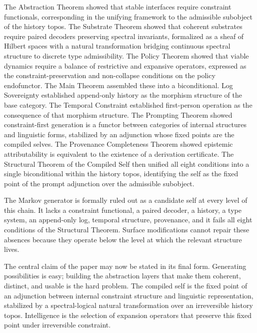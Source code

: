 \documentclass[12pt, a4paper]{article}
\theoremstyle{plain}
\theoremstyle{definition}
\theoremstyle{remark}
\begin{document}
The Abstraction Theorem showed that stable interfaces require constraint functionals, corresponding in the unifying framework to the admissible subobject of the history topos. The Substrate Theorem showed that coherent substrates require paired decoders preserving spectral invariants, formalized as a sheaf of Hilbert spaces with a natural transformation bridging continuous spectral structure to discrete type admissibility. The Policy Theorem showed that viable dynamics require a balance of restrictive and expansive operators, expressed as the constraint-preservation and non-collapse conditions on the policy endofunctor. The Main Theorem assembled these into a biconditional. Log Sovereignty established append-only history as the morphism structure of the base category. The Temporal Constraint established first-person operation as the consequence of that morphism structure. The Prompting Theorem showed constraint-first generation is a functor between categories of internal structures and linguistic forms, stabilized by an adjunction whose fixed points are the compiled selves. The Provenance Completeness Theorem showed epistemic attributability is equivalent to the existence of a derivation certificate. The Structural Theorem of the Compiled Self then unified all eight conditions into a single biconditional within the history topos, identifying the self as the fixed point of the prompt adjunction over the admissible subobject.

The Markov generator is formally ruled out as a candidate self at every level of this chain. It lacks a constraint functional, a paired decoder, a history, a type system, an append-only log, temporal structure, provenance, and it fails all eight conditions of the Structural Theorem. Surface modifications cannot repair these absences because they operate below the level at which the relevant structure lives.

The central claim of the paper may now be stated in its final form. Generating possibilities is easy; building the abstraction layers that make them coherent, distinct, and usable is the hard problem. The compiled self is the fixed point of an adjunction between internal constraint structure and linguistic representation, stabilized by a spectral-logical natural transformation over an irreversible history topos. Intelligence is the selection of expansion operators that preserve this fixed point under irreversible constraint.
\end{document}
